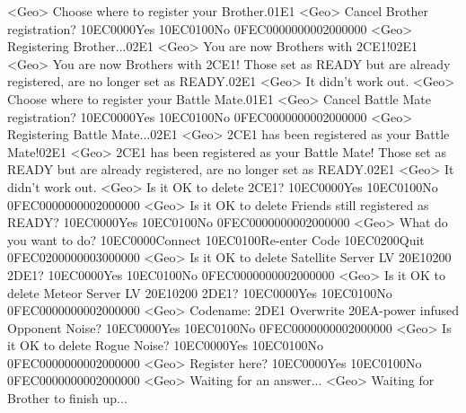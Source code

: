 <Geo> Choose where to register your Brother.{01}{E1}
<Geo> Cancel Brother registration? {10}{EC}{00}{00}Yes {10}{EC}{01}{00}No {0F}{EC}{00}{00}{00}{00}{02}{00}{00}{00}
<Geo> Registering Brother...{02}{E1}
<Geo> You are now Brothers with {2C}{E1}!{02}{E1}
<Geo> You are now Brothers with {2C}{E1}! 
Those set as READY but are already registered, are no longer set as READY.{02}{E1}
<Geo> It didn't work out. 
<Geo> Choose where to register your Battle Mate.{01}{E1}
<Geo> Cancel Battle Mate registration? {10}{EC}{00}{00}Yes {10}{EC}{01}{00}No {0F}{EC}{00}{00}{00}{00}{02}{00}{00}{00}
<Geo> Registering Battle Mate...{02}{E1}
<Geo> {2C}{E1} has been registered as your Battle Mate!{02}{E1}
<Geo> {2C}{E1} has been registered as your Battle Mate! 
Those set as READY but are already registered, are no longer set as READY.{02}{E1}
<Geo> It didn't work out. 
<Geo> Is it OK to delete {2C}{E1}? {10}{EC}{00}{00}Yes {10}{EC}{01}{00}No {0F}{EC}{00}{00}{00}{00}{02}{00}{00}{00}
<Geo> Is it OK to delete Friends still registered as READY? {10}{EC}{00}{00}Yes {10}{EC}{01}{00}No {0F}{EC}{00}{00}{00}{00}{02}{00}{00}{00}
<Geo> What do you want to do? {10}{EC}{00}{00}Connect {10}{EC}{01}{00}Re-enter Code {10}{EC}{02}{00}Quit {0F}{EC}{02}{00}{00}{00}{03}{00}{00}{00}
<Geo> Is it OK to delete Satellite Server LV {20}{E1}{02}{00} {2D}{E1}? {10}{EC}{00}{00}Yes {10}{EC}{01}{00}No {0F}{EC}{00}{00}{00}{00}{02}{00}{00}{00}
<Geo> Is it OK to delete Meteor Server LV {20}{E1}{02}{00} {2D}{E1}? {10}{EC}{00}{00}Yes {10}{EC}{01}{00}No {0F}{EC}{00}{00}{00}{00}{02}{00}{00}{00}
<Geo> Codename: {2D}{E1} Overwrite {20}{EA}-power infused Opponent Noise? {10}{EC}{00}{00}Yes {10}{EC}{01}{00}No {0F}{EC}{00}{00}{00}{00}{02}{00}{00}{00}
<Geo> Is it OK to delete Rogue Noise? {10}{EC}{00}{00}Yes {10}{EC}{01}{00}No {0F}{EC}{00}{00}{00}{00}{02}{00}{00}{00}
<Geo> Register here? {10}{EC}{00}{00}Yes {10}{EC}{01}{00}No {0F}{EC}{00}{00}{00}{00}{02}{00}{00}{00}
<Geo> Waiting for an answer...
<Geo> Waiting for Brother to finish up...
